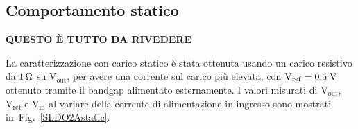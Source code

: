 \subsection{Comportamento statico}

\par \begin{center} {\huge\bf QUESTO \`E TUTTO DA RIVEDERE } \end{center} \par

La caratterizzazione con carico statico è stata ottenuta usando un carico resistivo da $1{\rm \, \Omega}$ su $\mathrm{V_{out}}$, per avere una corrente sul carico pi\`u elevata, con $\mathrm{V_{ref}} = 0.5 \rm \; V$ ottenuto tramite il bandgap alimentato esternamente.
I valori misurati di $\mathrm{V_{out}}$, $\mathrm{V_{ref}}$ e $\mathrm{V_{in}}$ al variare della corrente di alimentazione in ingresso sono mostrati in~Fig.~\ref{SLDO2Astatic}.

